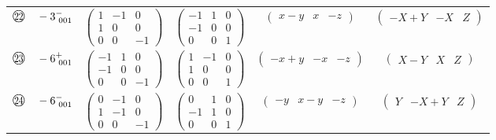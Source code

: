 \documentclass[fleqn,10pt,landscape]{jsarticle}
\begin{document}
\begin{center}
\begin{longtable}{lcccc}
$ {\ooalign{\hfil\resizebox{.8\width}{\height}{22}\hfil\crcr\raise.1ex\hbox{\large$\bigcirc$}}}\quad -3^{-}_{\,\,001} $ & $ \begin{pmatrix} 1 & -1 & 0 \\ 1 & 0 & 0 \\ 0 & 0 & -1 \end{pmatrix} $ & $ \begin{pmatrix} -1 & 1 & 0 \\ -1 & 0 & 0 \\ 0 & 0 & 1 \end{pmatrix} $ & $ \begin{pmatrix} x - y & x & - z \end{pmatrix} $ & $ \begin{pmatrix} - X + Y & - X & Z \end{pmatrix} $ \\
$ {\ooalign{\hfil\resizebox{.8\width}{\height}{23}\hfil\crcr\raise.1ex\hbox{\large$\bigcirc$}}}\quad -6^{+}_{\,\,001} $ & $ \begin{pmatrix} -1 & 1 & 0 \\ -1 & 0 & 0 \\ 0 & 0 & -1 \end{pmatrix} $ & $ \begin{pmatrix} 1 & -1 & 0 \\ 1 & 0 & 0 \\ 0 & 0 & 1 \end{pmatrix} $ & $ \begin{pmatrix} - x + y & - x & - z \end{pmatrix} $ & $ \begin{pmatrix} X - Y & X & Z \end{pmatrix} $ \\
$ {\ooalign{\hfil\resizebox{.8\width}{\height}{24}\hfil\crcr\raise.1ex\hbox{\large$\bigcirc$}}}\quad -6^{-}_{\,\,001} $ & $ \begin{pmatrix} 0 & -1 & 0 \\ 1 & -1 & 0 \\ 0 & 0 & -1 \end{pmatrix} $ & $ \begin{pmatrix} 0 & 1 & 0 \\ -1 & 1 & 0 \\ 0 & 0 & 1 \end{pmatrix} $ & $ \begin{pmatrix} - y & x - y & - z \end{pmatrix} $ & $ \begin{pmatrix} Y & - X + Y & Z \end{pmatrix} $ \\
\end{longtable}
\end{center}
\end{document}
